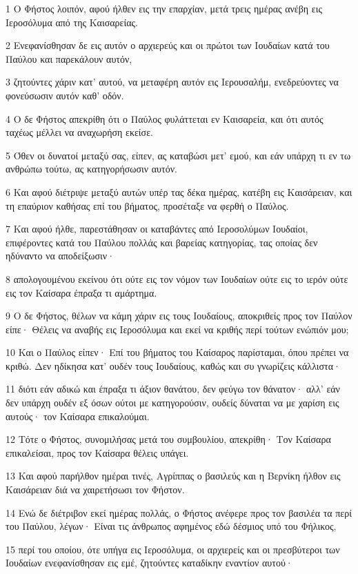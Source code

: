 \par 1 Ο Φήστος λοιπόν, αφού ήλθεν εις την επαρχίαν, μετά τρεις ημέρας ανέβη εις Ιεροσόλυμα από της Καισαρείας.
\par 2 Ενεφανίσθησαν δε εις αυτόν ο αρχιερεύς και οι πρώτοι των Ιουδαίων κατά του Παύλου και παρεκάλουν αυτόν,
\par 3 ζητούντες χάριν κατ' αυτού, να μεταφέρη αυτόν εις Ιερουσαλήμ, ενεδρεύοντες να φονεύσωσιν αυτόν καθ' οδόν.
\par 4 Ο δε Φήστος απεκρίθη ότι ο Παύλος φυλάττεται εν Καισαρεία, και ότι αυτός ταχέως μέλλει να αναχωρήση εκείσε.
\par 5 Όθεν οι δυνατοί μεταξύ σας, είπεν, ας καταβώσι μετ' εμού, και εάν υπάρχη τι εν τω ανθρώπω τούτω, ας κατηγορήσωσιν αυτόν.
\par 6 Και αφού διέτριψε μεταξύ αυτών υπέρ τας δέκα ημέρας, κατέβη εις Καισάρειαν, και τη επαύριον καθήσας επί του βήματος, προσέταξε να φερθή ο Παύλος.
\par 7 Και αφού ήλθε, παρεστάθησαν οι καταβάντες από Ιεροσολύμων Ιουδαίοι, επιφέροντες κατά του Παύλου πολλάς και βαρείας κατηγορίας, τας οποίας δεν ηδύναντο να αποδείξωσιν·
\par 8 απολογουμένου εκείνου ότι ούτε εις τον νόμον των Ιουδαίων ούτε εις το ιερόν ούτε εις τον Καίσαρα έπραξα τι αμάρτημα.
\par 9 Ο δε Φήστος, θέλων να κάμη χάριν εις τους Ιουδαίους, αποκριθείς προς τον Παύλον είπε· Θέλεις να αναβής εις Ιεροσόλυμα και εκεί να κριθής περί τούτων ενώπιόν μου;
\par 10 Και ο Παύλος είπεν· Επί του βήματος του Καίσαρος παρίσταμαι, όπου πρέπει να κριθώ. Δεν ηδίκησα κατ' ουδέν τους Ιουδαίους, καθώς και συ γνωρίζεις κάλλιστα·
\par 11 διότι εάν αδικώ και έπραξα τι άξιον θανάτου, δεν φεύγω τον θάνατον· αλλ' εάν δεν υπάρχη ουδέν εξ όσων ούτοι με κατηγορούσιν, ουδείς δύναται να με χαρίση εις αυτούς· τον Καίσαρα επικαλούμαι.
\par 12 Τότε ο Φήστος, συνομιλήσας μετά του συμβουλίου, απεκρίθη· Τον Καίσαρα επικαλείσαι, προς τον Καίσαρα θέλεις υπάγει.
\par 13 Και αφού παρήλθον ημέραι τινές, Αγρίππας ο βασιλεύς και η Βερνίκη ήλθον εις Καισάρειαν διά να χαιρετήσωσι τον Φήστον.
\par 14 Ενώ δε διέτριβον εκεί ημέρας πολλάς, ο Φήστος ανέφερε προς τον βασιλέα τα περί του Παύλου, λέγων· Είναι τις άνθρωπος αφημένος εδώ δέσμιος υπό του Φήλικος,
\par 15 περί του οποίου, ότε υπήγα εις Ιεροσόλυμα, οι αρχιερείς και οι πρεσβύτεροι των Ιουδαίων ενεφανίσθησαν εις εμέ, ζητούντες καταδίκην εναντίον αυτού·

